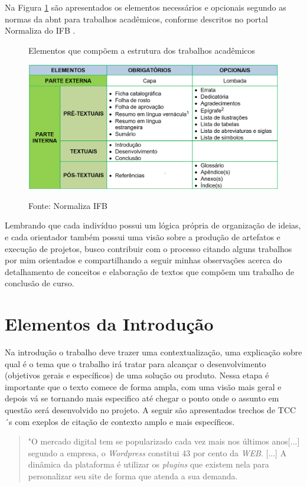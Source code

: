 Na Figura \ref{fig:Normaliza} são apresentados  os elementos necessários e opcionais segundo as normas da \ac{abnt} para trabalhos acadêmicos, conforme descritos no portal Normaliza do IFB \citep{ifbnormaliza}.

\begin{figure}[h!] 
    \caption{Elementos que compõem a estrutura dos trabalhos acadêmicos}
    \centering
    \includegraphics [width=1\textwidth] 
    {images/normaliza_ifb.png}
     \label{fig:Normaliza}
    \captionsetup{labelformat=empty}
    \caption*{Fonte: Normaliza IFB}
\end{figure}

Lembrando que cada indivíduo possui um lógica própria de organização de ideias, e cada orientador também possui uma visão sobre a produção de artefatos e execução de projetos, busco contribuir com o processo citando alguns trabalhos por mim orientados e compartilhando a seguir minhas observações acerca do detalhamento de conceitos e elaboração de textos que compõem um trabalho de conclusão de curso. 

\section{Elementos da Introdução}

Na introdução o trabalho deve trazer uma contextualização, uma explicação sobre qual é o tema que o trabalho irá tratar para alcançar o desenvolvimento (objetivos gerais e específicos) de uma solução ou produto. Nessa etapa é importante que o texto comece de forma ampla, com uma visão mais geral e depois vá se tornando mais especifico até chegar o ponto onde o assunto em questão será desenvolvido no projeto. A seguir são apresentados trechos de TCC´s com exeplos de citação de contexto amplo e mais específicos.

\begin{quote}
    "O mercado digital tem se popularizado cada vez mais nos últimos anos[...] segundo a empresa, o \textit{Wordpress}  constitui 43 por cento da \textit{WEB}. [...] A dinâmica da plataforma é utilizar os \textit{plugins} que existem nela para personalizar seu site de forma que atenda a sua demanda. \cite{marçal}
\end{quote}

